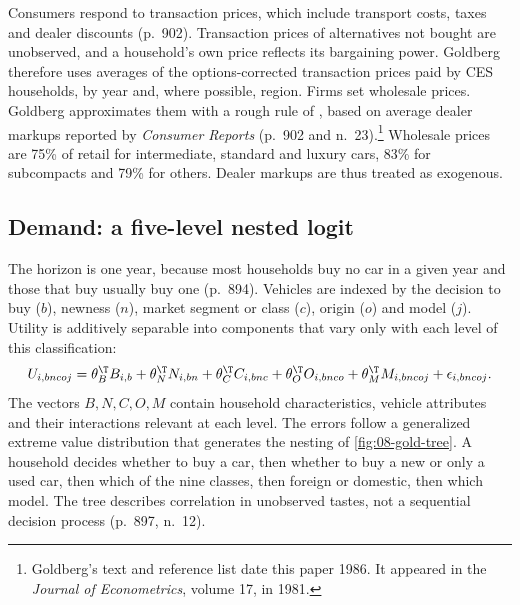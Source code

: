 Consumers respond to transaction prices, which include transport costs, taxes and dealer discounts
(p.~902). Transaction prices of alternatives not bought are unobserved, and a household's own price reflects its
bargaining power. Goldberg therefore uses averages of the options-corrected transaction prices paid by CES
households, by year and, where possible, region. Firms set wholesale prices. Goldberg approximates them with a
rough rule of \citet{Bresnahan1981}, based on average dealer markups reported by \emph{Consumer Reports}
(p.~902 and n.~23).\footnote{Goldberg's text and reference list date this paper 1986. It appeared in the
\emph{Journal of Econometrics}, volume 17, in 1981.} Wholesale prices are 75\% of retail for
intermediate, standard and luxury cars, 83\% for subcompacts and 79\% for others. Dealer markups are thus treated as exogenous.

\subsection{Demand: a five-level nested logit}\label{sec:08-goldberg-demand}

The horizon is one year, because most households buy no car in a given year and those that buy usually buy one
(p.~894). Vehicles are indexed by the decision to buy ($b$), newness ($n$), market segment or class ($c$),
origin ($o$) and model ($j$). Utility is additively separable into components that vary only with each level of
this classification:
\begin{equation}\label{eq:08-gold-utility}
U_{i,bncoj} = \theta_B^{\T}B_{i,b} + \theta_N^{\T}N_{i,bn} + \theta_C^{\T}C_{i,bnc} + \theta_O^{\T}O_{i,bnco}
+ \theta_M^{\T}M_{i,bncoj} + \epsilon_{i,bncoj} .
\end{equation}
The vectors $B, N, C, O, M$ contain household characteristics, vehicle attributes and their interactions
relevant at each level. The errors follow a generalized extreme value distribution that generates the nesting of
\cref{fig:08-gold-tree}. A household decides whether to buy a car, then whether to buy a new or only a used car,
then which of the nine classes, then foreign or domestic, then which model. The tree describes correlation in
unobserved tastes, not a sequential decision process (p.~897, n.~12).


